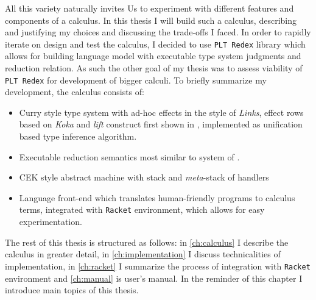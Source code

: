 \documentclass[inz, english, shortabstract]{iithesis}
\newcommand{\Redex}{\texttt{PLT Redex}}
\newcommand{\Racket}{\texttt{Racket}}
\begin{document}
All this variety naturally invites Us to experiment with different features and components of a calculus.
In this thesis I will build such a calculus, describing and justifying my choices and discussing the trade-offs I faced.
In order to rapidly iterate on design and test the calculus, I decided to use \Redex{} library which allows for building language model with executable type system judgments and reduction relation.
As such the other goal of my thesis was to assess viability of \Redex{} for development of bigger calculi.
To briefly summarize my development, the calculus consists of: 
\begin{itemize}
  \item Curry style type system with ad-hoc effects in the style of \emph{Links}, effect rows based on \emph{Koka} and \emph{lift} construct first shown in \cite{Biernacki2017}, implemented as unification based type inference algorithm.
  \item Executable reduction semantics most similar to system of \cite{Biernacki2017}.
  \item CEK style abstract machine with stack and \emph{meta}-stack of handlers
  \item Language front-end which translates human-friendly programs to calculus terms, integrated with \Racket{} environment, which allows for easy experimentation.
\end{itemize}

The rest of this thesis is structured as follows: in \autoref{ch:calculus} I describe the calculus in greater detail, in \autoref{ch:implementation} I discuss technicalities of implementation, in \autoref{ch:racket} I summarize the process of integration with \Racket{} environment and \autoref{ch:manual} is user's manual.
In the reminder of this chapter I introduce main topics of this thesis.
\end{document}
